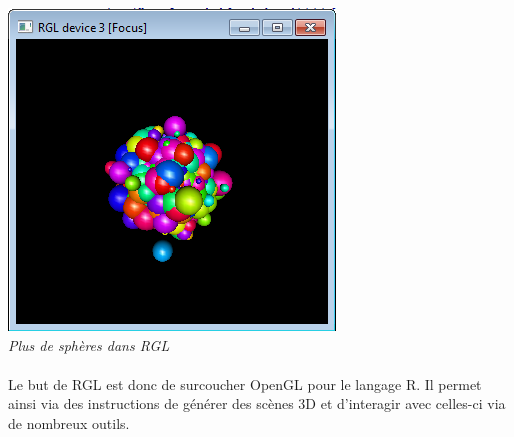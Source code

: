 \begin{center}
\includegraphics[scale=0.7]{screen_rgl3.png}\\
\textit{Plus de sphères dans RGL}
\end{center}


\paragraph{}
Le but de RGL est donc de surcoucher OpenGL pour le langage R. Il permet ainsi via des instructions de générer des scènes 3D et d'interagir avec celles-ci via de nombreux outils.
